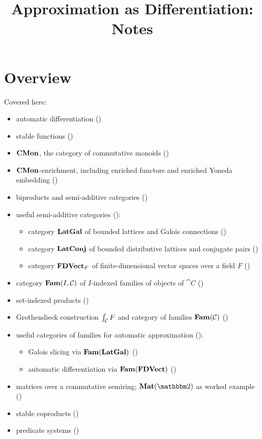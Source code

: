 \documentclass[acmsmall,screen]{acmart}
\begin{document}
\title{Approximation as Differentiation: Notes}

\maketitle

\section{Overview}

Covered here:
\begin{itemize}
\item automatic differentiation ()
\item stable functions ()
\item $\mathbf{CMon}$, the category of commutative monoids ()
\item $\mathbf{CMon}$-enrichment, including enriched functors and enriched Yoneda embedding ()
\item biproducts and semi-additive categories ()
\item useful semi-additive categories ():
   \begin{itemize}
   \item category $\mathbf{LatGal}$ of bounded lattices and Galois connections ()
   \item category $\mathbf{LatConj}$ of bounded distributive lattices and conjugate pairs
   ()
   \item category $\mathbf{FDVect}_F$ of finite-dimensional vector spaces over a field $F$
   ()
   \end{itemize}
\item category $\mathbf{Fam}(I,\mathcal{C})$ of $I$-indexed families of objects of $\cat{C}$ ()
\item set-indexed products ()
\item Grothendieck construction $\int_{\mathcal{C}}F$ and category of families $\mathbf{Fam}(\mathcal{C})$
()
\item useful categories of families for automatic approximation
():
   \begin{itemize}
      \item Galois slicing via $\mathbf{Fam}(\mathbf{LatGal})$ ()
      \item automatic differentiation via $\mathbf{Fam}(\mathbf{FDVect})$ ()
   \end{itemize}
\item matrices over a commutative semiring; $\Mat(\Two)$ as worked example ()
\item stable coproducts ()
\item predicate systems ()
\end{itemize}
\end{document}
